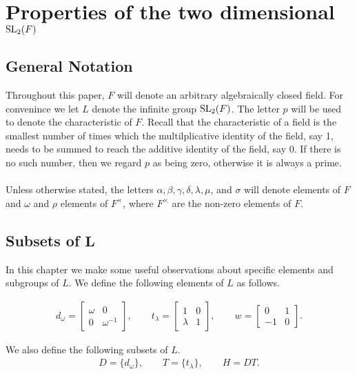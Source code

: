 \chapter{Properties of the two dimensional $\operatorname{SL}_2(F)$}\label{Ch5_PropertiesOfSLOverAlgClosedField}


\section{General Notation}

Throughout this paper, $F$ will denote an arbitrary algebraically closed field. For convenince we let $L$ denote the infinite group $\operatorname{SL}_2(F)$. The letter $p$ will be used to denote the characteristic of $F$. Recall that the characteristic of a field is the smallest number of times which the multilplicative identity of the field, say 1, needs to be summed to reach the additive identity of the field, say 0. If there is no such number, then we regard $p$ as being zero, otherwise it is always a prime. \\
\\
Unless otherwise stated, the letters $\alpha, \beta, \gamma, \delta, \lambda, \mu$, and $\sigma$ will denote elements of $F$ and $\omega$ and $\rho$ elements of $F^\times$, where $F^\times$  are the non-zero elements of $F$.

\section[Subsets of $L$]{Subsets of $\pmb{L}$}

In this chapter we make some useful observations about specific elements and subgroups of $L$. We define the following elements of $L$ as follows.

\begin{align*} d_\omega = \begin{bmatrix} \omega & 0 \\ 0 & \omega^{-1} \end{bmatrix}, \qquad t_\lambda = \begin{bmatrix} 1 & 0 \\ \lambda & 1 \end{bmatrix}, \qquad w = \begin{bmatrix} 0 & 1 \\ - 1 & 0 \end{bmatrix}  \tag{$\omega \in F^\times$ and $\lambda \in F$}.
\end{align*}

We also define the following subsets of $L$.
\begin{align*} D= \{d_\omega\}, \qquad T= \{t_\lambda\}, \qquad H=DT.
\end{align*}


